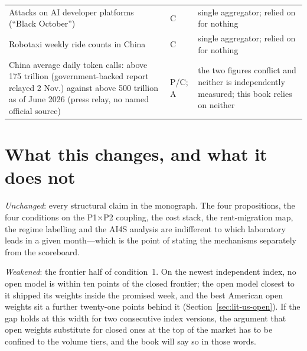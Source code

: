 \begin{small}
\begin{longtable}{p{50mm}p{14mm}p{76mm}}
  Attacks on AI developer platforms (``Black October'') & C & single aggregator; relied on for nothing \\
  Robotaxi weekly ride counts in China & C & single aggregator; relied on for nothing \\
  China average daily token calls: above 175 trillion (government-backed report relayed 2 Nov.) against above 500 trillion as of June 2026 (press relay, no named official source) & P/C; A & the two figures conflict and neither is independently measured; this book relies on neither \\
\end{longtable}
\end{small}

\section{What this changes, and what it does not}

\emph{Unchanged}: every structural claim in the monograph. The four propositions, the four conditions on the P1$\times$P2 coupling, the cost stack, the rent-migration map, the regime labelling and the AI4S analysis are indifferent to which laboratory leads in a given month---which is the point of stating the mechanisms separately from the scoreboard.

\emph{Weakened}: the frontier half of condition~1. On the newest independent index, no open model is within ten points of the closed frontier; the open model closest to it shipped its weights inside the promised week, and the best American open weights sit a further twenty-one points behind it (Section~\ref{sec:lit-us-open}). If the gap holds at this width for two consecutive index versions, the argument that open weights substitute for closed ones at the top of the market has to be confined to the volume tiers, and the book will say so in those words.

